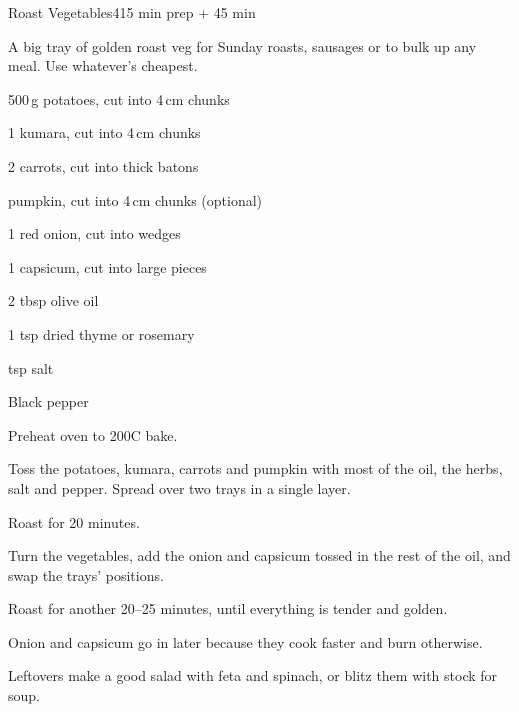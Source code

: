 \begin{recipebox}{Roast Vegetables}{4}{15 min prep + 45 min}

A big tray of golden roast veg for Sunday roasts, sausages or to bulk up any
meal. Use whatever's cheapest.

\begin{ingredients}
  \item 500\,g potatoes, cut into 4\,cm chunks
  \item 1 kumara, cut into 4\,cm chunks
  \item 2 carrots, cut into thick batons
  \item {} pumpkin, cut into 4\,cm chunks (optional)
  \item 1 red onion, cut into wedges
  \item 1 capsicum, cut into large pieces
  \item 2 tbsp olive oil
  \item 1 tsp dried thyme or rosemary
  \item {} tsp salt
  \item Black pepper
\end{ingredients}

\begin{method}
  \item Preheat oven to 200\degree C bake.
  \item Toss the potatoes, kumara, carrots and pumpkin with most of the oil, the herbs, salt and pepper. Spread over two trays in a single layer.
  \item Roast for 20 minutes.
  \item Turn the vegetables, add the onion and capsicum tossed in the rest of the oil, and swap the trays' positions.
  \item Roast for another 20--25 minutes, until everything is tender and golden.
\end{method}

\begin{notelist}
  \item Onion and capsicum go in later because they cook faster and burn otherwise.
  \item Leftovers make a good salad with feta and spinach, or blitz them with stock for soup.
\end{notelist}

\end{recipebox}
